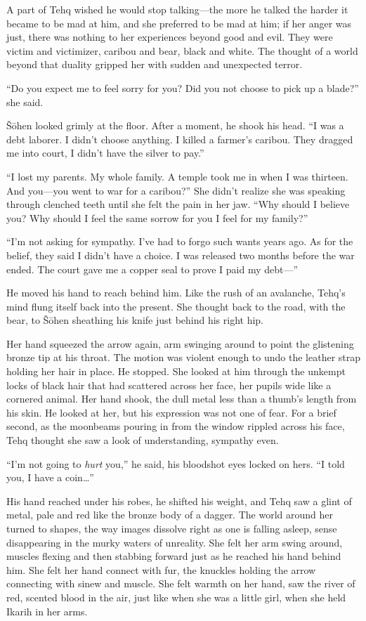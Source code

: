 A part of Tehq wished he would stop talking---the more he talked the harder it became to be mad at him, and she preferred to be mad at him; if her anger was just, there was nothing to her experiences beyond good and evil. They were victim and victimizer, caribou and bear, black and white. The thought of a world beyond that duality gripped her with sudden and unexpected terror.

``Do you expect me to feel sorry for you? Did you not choose to pick up a blade?'' she said.

Šōhen looked grimly at the floor. After a moment, he shook his head. ``I was a debt laborer. I didn't choose anything. I killed a farmer's caribou. They dragged me into court, I didn't have the silver to pay.''

``I lost my parents. My whole family. A temple took me in when I was thirteen. And you---you went to war for a caribou?'' She didn't realize she was speaking through clenched teeth until she felt the pain in her jaw. ``Why should I believe you? Why should I feel the same sorrow for you I feel for my family?''

``I'm not asking for sympathy. I've had to forgo such wants years ago. As for the belief, they said I didn't have a choice. I was released two months before the war ended. The court gave me a copper seal to prove I paid my debt---''

He moved his hand to reach behind him. Like the rush of an avalanche, Tehq's mind flung itself back into the present. She thought back to the road, with the bear, to Šōhen sheathing his knife just behind his right hip.

Her hand squeezed the arrow again, arm swinging around to point the glistening bronze tip at his throat. The motion was violent enough to undo the leather strap holding her hair in place. He stopped. She looked at him through the unkempt locks of black hair that had scattered across her face, her pupils wide like a cornered animal. Her hand shook, the dull metal less than a thumb's length from his skin. He looked at her, but his expression was not one of fear. For a brief second, as the moonbeams pouring in from the window rippled across his face, Tehq thought she saw a look of understanding, sympathy even.

``I'm not going to \emph{hurt} you,'' he said, his bloodshot eyes locked on hers. ``I told you, I have a coin\ldots''

His hand reached under his robes, he shifted his weight, and Tehq saw a glint of metal, pale and red like the bronze body of a dagger. The world around her turned to shapes, the way images dissolve right as one is falling asleep, sense disappearing in the murky waters of unreality. She felt her arm swing around, muscles flexing and then stabbing forward just as he reached his hand behind him. She felt her hand connect with fur, the knuckles holding the arrow connecting with sinew and muscle. She felt warmth on her hand, saw the river of red, scented blood in the air, just like when she was a little girl, when she held Ikarih in her arms.

